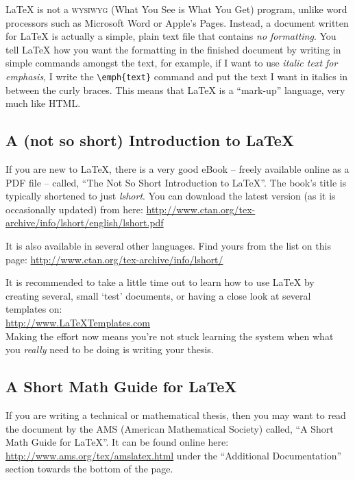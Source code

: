\LaTeX{} is not a \textsc{wysiwyg} (What You See is What You Get) program, unlike word processors such as Microsoft Word or Apple's Pages. Instead, a document written for \LaTeX{} is actually a simple, plain text file that contains \emph{no formatting}. You tell \LaTeX{} how you want the formatting in the finished document by writing in simple commands amongst the text, for example, if I want to use \emph{italic text for emphasis}, I write the \verb|\emph{text}| command and put the text I want in italics in between the curly braces. This means that \LaTeX{} is a \enquote{mark-up} language, very much like HTML.

\subsection{A (not so short) Introduction to \LaTeX{}}

If you are new to \LaTeX{}, there is a very good eBook -- freely available online as a PDF file -- called, \enquote{The Not So Short Introduction to \LaTeX{}}. The book's title is typically shortened to just \emph{lshort}. You can download the latest version (as it is occasionally updated) from here:
\url{http://www.ctan.org/tex-archive/info/lshort/english/lshort.pdf}

It is also available in several other languages. Find yours from the list on this page: \url{http://www.ctan.org/tex-archive/info/lshort/}

It is recommended to take a little time out to learn how to use \LaTeX{} by creating several, small `test' documents, or having a close look at several templates on:\\
\url{http://www.LaTeXTemplates.com}\\
Making the effort now means you're not stuck learning the system when what you \emph{really} need to be doing is writing your thesis.

\subsection{A Short Math Guide for \LaTeX{}}

If you are writing a technical or mathematical thesis, then you may want to read the document by the AMS (American Mathematical Society) called, \enquote{A Short Math Guide for \LaTeX{}}. It can be found online here:
\url{http://www.ams.org/tex/amslatex.html}
under the \enquote{Additional Documentation} section towards the bottom of the page.

